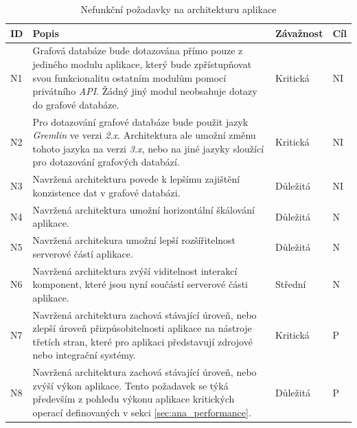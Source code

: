 \begin{table}[h!]
\begin{center}
\centering
\caption{Nefunkční požadavky na architekturu aplikace}
\label{tab:nonfuncional}
\begin{tabular}{|p{1cm}|p{9cm}|p{2cm}|p{1cm}|}
	\hline
    ID & Popis & Závažnost & Cíl \\ \hline

    N1 & Grafová databáze bude dotazována přímo pouze z jediného modulu aplikace, který bude zpřístupňovat svou funkcionalitu ostatním modulům pomocí privátního \textit{API}.  Žádný jiný modul neobsahuje dotazy do grafové databáze. & Kritická  & NI  \\ \hline

	 N2 & Pro dotazování grafové databáze bude použit jazyk \textit{Gremlin} ve verzi \textit{2.x}. Architektura ale umožní změnu tohoto jazyka na verzi \textit{3.x}, nebo na jiné jazyky sloužící pro dotazování grafových databází. & Kritická  & NI  \\ \hline

	 N3 & Navržená architektura povede k lepšímu zajištění konzistence dat v grafové databázi. & Důležitá & NI \\ \hline

	 N4 & Navržená architektura umožní horizontální škálování aplikace. & Důležitá  & N   \\ \hline

	 N5 & Navržená architekura umožní lepší rozšířitelnost serverové částí aplikace. & Důležitá & N \\ \hline

	 N6 & Navržená architektura zvýší viditelnost interakcí komponent, které jsou nyní součástí serverové části aplikace.  & Střední & N \\ \hline

	 N7 & Navržená architektura zachová stávající úroveň, nebo zlepší úroveň přizpůsobitelnosti aplikace na nástroje třetích stran, které pro aplikaci představují zdrojové nebo integrační systémy. & Kritická & P \\ \hline

	 N8 & Navržená architektura zachová stávající úroveň, nebo zvýší výkon aplikace. Tento požadavek se týká především z pohledu výkonu aplikace kritických operací definovaných v sekci \ref{sec:ana_performance}. & Důležitá & P \\ \hline
 \end{tabular}
 \end{center}
 \end{table}

